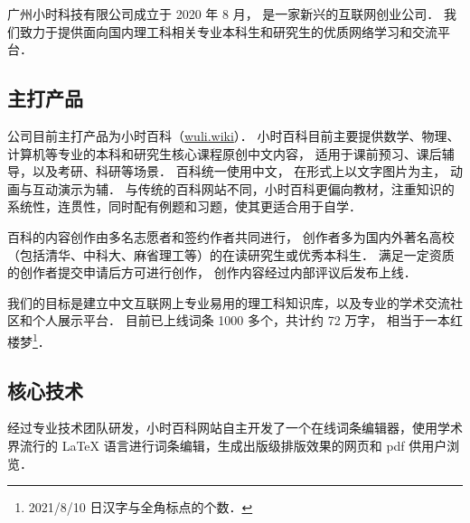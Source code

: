 
广州小时科技有限公司成立于 2020 年 8 月， 是一家新兴的互联网创业公司． 我们致力于提供面向国内理工科相关专业本科生和研究生的优质网络学习和交流平台．

\subsection{主打产品}
公司目前主打产品为小时百科（\href{https://wuli.wiki}{wuli.wiki}）． 小时百科目前主要提供数学、物理、计算机等专业的本科和研究生核心课程原创中文内容， 适用于课前预习、课后辅导，以及考研、科研等场景． 百科统一使用中文， 在形式上以文字图片为主， 动画与互动演示为辅． 与传统的百科网站不同，小时百科更偏向教材，注重知识的系统性，连贯性，同时配有例题和习题，使其更适合用于自学．

百科的内容创作由多名志愿者和签约作者共同进行， 创作者多为国内外著名高校（包括清华、中科大、麻省理工等）的在读研究生或优秀本科生． 满足一定资质的创作者提交申请后方可进行创作， 创作内容经过内部评议后发布上线．

我们的目标是建立中文互联网上专业易用的理工科知识库，以及专业的学术交流社区和个人展示平台． 目前已上线词条 1000 多个，共计约 72 万字， 相当于一本红楼梦\footnote{2021/8/10 日汉字与全角标点的个数．}．

\subsection{核心技术}
经过专业技术团队研发，小时百科网站自主开发了一个在线词条编辑器，使用学术界流行的 LaTeX 语言进行词条编辑，生成出版级排版效果的网页和 pdf 供用户浏览．
